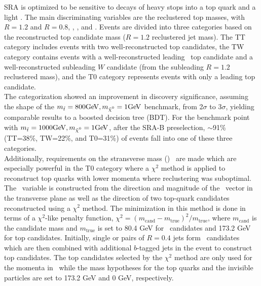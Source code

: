 SRA is optimized to be sensitive to decays of heavy stops into a top quark and a light \LSP. The main discriminating variables are the reclustered top masses, with $R=1.2$ and $R=0.8$, \mtbmin, \drbjetbjet, and \met. Events are divided into three categories based on the reconstructed top candidate mass ($R=1.2$ reclustered jet mass). The TT category includes events with two well-reconstructed top candidates, the TW category contains events with a well-reconstructed leading \pt\ top candidate and a well-reconstructed subleading $W$ candidate (from the subleading $R=1.2$ reclustered mass), and the T0 category represents events with only a leading top candidate. \\

The categorization showed an improvement in discovery significance, assuming the shape of the $\mstop=800\gev,\mLSP=1\gev$ benchmark, from 2$\sigma$ to 3$\sigma$, yielding comparable results to a boosted decision tree (BDT). For the benchmark point with $\mstop=1000\gev,\mLSP=1\gev$, after the SRA-B preselection, $\sim$91\% (TT=38\%, TW=22\%, and T0=31\%) of events fall into one of these three categories.  \\ %

Additionally, requirements on the stransverse mass (\mttwo)~\cite{Lester:1999tx,Barr:2003rg}
are made which are especially powerful in the T0 category where a $\chi^2$ method is applied to reconstruct top quarks with lower momenta where reclustering was suboptimal. 
The \mttwo\ variable is constructed from the direction and magnitude of the \ptmiss\ vector in the transverse plane as well as the direction of two top-quark candidates reconstructed using a $\chi^2$ method. 
The minimization in this method is done in terms of a $\chi^2$-like penalty function, $\chi^2 = (m_{\mathrm{cand}}-m_{\mathrm{true}})^2/m_{\mathrm{true}}$, where $m_{\mathrm{cand}}$ is the candidate mass and $m_{\mathrm{true}}$ is set to 80.4 GeV for \Wboson\ candidates and 173.2 GeV for top candidates. 
Initially, single or pairs of $R=0.4$ jets form \Wboson\ candidates which are then combined with additional $b$-tagged jets in the event to construct top candidates. The top candidates selected by the $\chi^2$ method are only used for the momenta in \mttwo\ while the mass hypotheses for the top quarks and the invisible particles are set to 173.2 GeV and 0 GeV, respectively. \\

